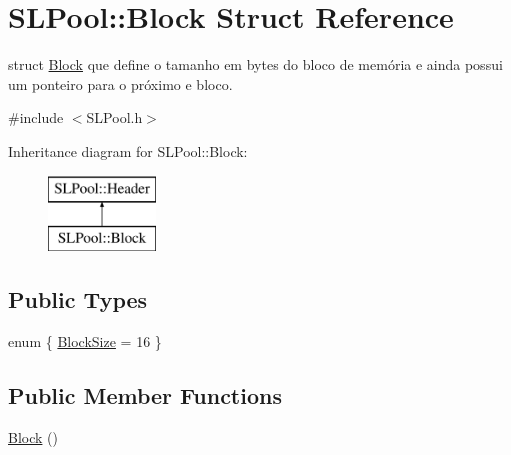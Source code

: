 \hypertarget{struct_s_l_pool_1_1_block}{}\section{S\+L\+Pool\+:\+:Block Struct Reference}
\label{struct_s_l_pool_1_1_block}


struct \hyperlink{struct_s_l_pool_1_1_block}{Block} que define o tamanho em bytes do bloco de memória e ainda possui um ponteiro para o próximo e bloco.  




{\ttfamily \#include $<$S\+L\+Pool.\+h$>$}

Inheritance diagram for S\+L\+Pool\+:\+:Block\+:\begin{figure}[H]
\begin{center}
\leavevmode
\includegraphics[height=2.000000cm]{struct_s_l_pool_1_1_block}
\end{center}
\end{figure}
\subsection*{Public Types}
\begin{DoxyCompactItemize}
\item 
enum \{ \hyperlink{struct_s_l_pool_1_1_block_adbb416e65dd0d7aa2121e30b34424db8a32fd11caed7c39eb5ab3949a612a14b9}{Block\+Size} = 16
 \}
\end{DoxyCompactItemize}
\subsection*{Public Member Functions}
\begin{DoxyCompactItemize}
\item 
\hyperlink{struct_s_l_pool_1_1_block_a2657816d1a41e84aa7ad25cdcf83ac60}{Block} ()
\end{DoxyCompactItemize}
